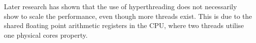 \documentclass[12pt,a4paper]{article}
\begin{document}
    Later research has shown that the use of hyperthreading does not necessarily show to scale the performance, even though more threads exist. \cite{leng_empirical_2002} This is due to the shared floating point arithmetic registers in the CPU, where two threads utilise one physical cores property. 
\end{document}
